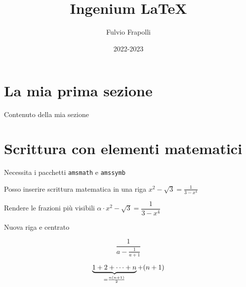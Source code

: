 \documentclass[a4paper,12pt]{article} %
\author{Fulvio Frapolli} %
\title{Ingenium \LaTeX}%
\date{2022-2023} %
\begin{document}
    
\maketitle%

\tableofcontents %
\newpage %

\section{La mia prima sezione} %

Contenuto della mia sezione

\section{Scrittura con elementi matematici}

Necessita i pacchetti \verb|amsmath| e \verb|amssymb|

Posso inserire scrittura matematica in una riga $x^2-\sqrt{3}=\frac{1}{3-x^4}$

Rendere le frazioni più visibili  $\alpha \cdot  x^2-\sqrt{3}=\dfrac{1}{3-x^4}$

Nuova riga e centrato 

\[
\frac{1}{a-\frac{1}{a+1}}    
\]


\[
\underbrace{1+2+\dots+n}_%
{=\frac{n(n+1)}{2}}
+(n+1)
\]
\end{document}
